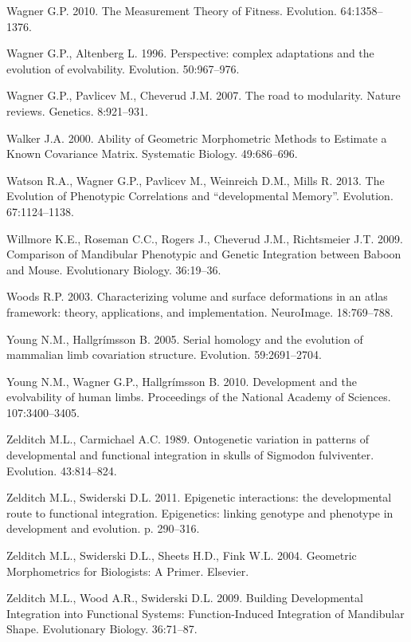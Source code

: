 \documentclass[12pt,]{article}
\begin{document}
Wagner G.P. 2010. The Measurement Theory of Fitness. Evolution.
64:1358--1376.

Wagner G.P., Altenberg L. 1996. Perspective: complex adaptations and the
evolution of evolvability. Evolution. 50:967--976.

Wagner G.P., Pavlicev M., Cheverud J.M. 2007. The road to modularity.
Nature reviews. Genetics. 8:921--931.

Walker J.A. 2000. Ability of Geometric Morphometric Methods to Estimate
a Known Covariance Matrix. Systematic Biology. 49:686--696.

Watson R.A., Wagner G.P., Pavlicev M., Weinreich D.M., Mills R. 2013.
The Evolution of Phenotypic Correlations and ``developmental Memory''.
Evolution. 67:1124--1138.

Willmore K.E., Roseman C.C., Rogers J., Cheverud J.M., Richtsmeier J.T.
2009. Comparison of Mandibular Phenotypic and Genetic Integration
between Baboon and Mouse. Evolutionary Biology. 36:19--36.

Woods R.P. 2003. Characterizing volume and surface deformations in an
atlas framework: theory, applications, and implementation. NeuroImage.
18:769--788.

Young N.M., Hallgrímsson B. 2005. Serial homology and the evolution of
mammalian limb covariation structure. Evolution. 59:2691--2704.

Young N.M., Wagner G.P., Hallgrímsson B. 2010. Development and the
evolvability of human limbs. Proceedings of the National Academy of
Sciences. 107:3400--3405.

Zelditch M.L., Carmichael A.C. 1989. Ontogenetic variation in patterns
of developmental and functional integration in skulls of Sigmodon
fulviventer. Evolution. 43:814--824.

Zelditch M.L., Swiderski D.L. 2011. Epigenetic interactions: the
developmental route to functional integration. Epigenetics: linking
genotype and phenotype in development and evolution. p. 290--316.

Zelditch M.L., Swiderski D.L., Sheets H.D., Fink W.L. 2004. Geometric
Morphometrics for Biologists: A Primer. Elsevier.

Zelditch M.L., Wood A.R., Swiderski D.L. 2009. Building Developmental
Integration into Functional Systems: Function-Induced Integration of
Mandibular Shape. Evolutionary Biology. 36:71--87.
\end{document}
